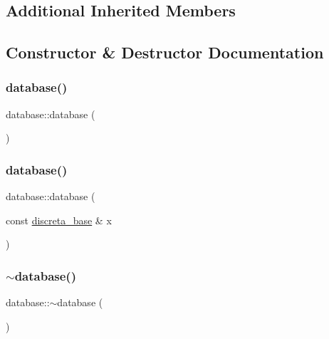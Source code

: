 \subsection*{Additional Inherited Members}


\subsection{Constructor \& Destructor Documentation}
\mbox{\label{classdatabase_a35ec480ed529a9d092a7ebc5472b767f}} 
\subsubsection{\texorpdfstring{database()}{database()}\hspace{0.1cm}{\footnotesize\ttfamily [1/2]}}
{\footnotesize\ttfamily database\+::database (\begin{DoxyParamCaption}{ }\end{DoxyParamCaption})}

\mbox{\label{classdatabase_af9fba38cbd879c1a3c0388c111c774ef}} 
\subsubsection{\texorpdfstring{database()}{database()}\hspace{0.1cm}{\footnotesize\ttfamily [2/2]}}
{\footnotesize\ttfamily database\+::database (\begin{DoxyParamCaption}\item[{const \mbox{\hyperlink{classdiscreta__base}{discreta\+\_\+base}} \&}]{x }\end{DoxyParamCaption})}

\mbox{\label{classdatabase_a31008de680565a626cd975c25d4351db}} 
\subsubsection{\texorpdfstring{$\sim$database()}{~database()}}
{\footnotesize\ttfamily database\+::$\sim$database (\begin{DoxyParamCaption}{ }\end{DoxyParamCaption})}



